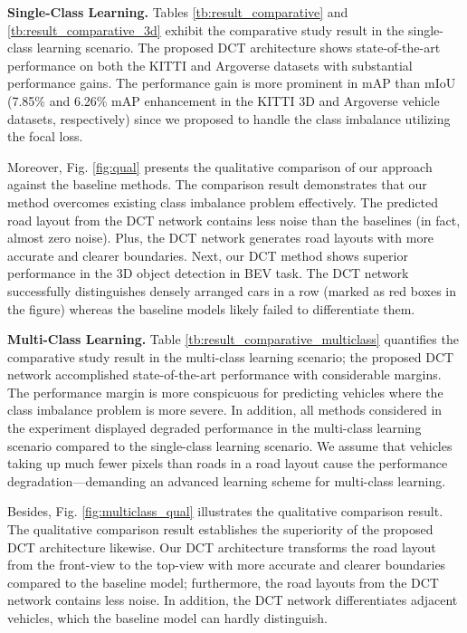 \textbf{Single-Class Learning.}
Tables \ref{tb:result_comparative} and \ref{tb:result_comparative_3d} exhibit the comparative study result in the single-class learning scenario. The proposed DCT architecture shows state-of-the-art performance on both the KITTI and Argoverse datasets with substantial performance gains. The performance gain is more prominent in mAP than mIoU (7.85\% and 6.26\% mAP enhancement in the KITTI 3D and Argoverse vehicle datasets, respectively) since we proposed to handle the class imbalance utilizing the focal loss.



Moreover, Fig. \ref{fig:qual} presents the qualitative comparison of our approach against the baseline methods. The comparison result demonstrates that our method overcomes existing class imbalance problem effectively. The predicted road layout from the DCT network contains less noise than the baselines (in fact, almost zero noise). Plus, the DCT network generates road layouts with more accurate and clearer boundaries. Next, our DCT method shows superior performance in the 3D object detection in BEV task. The DCT network successfully distinguishes densely arranged cars in a row (marked as red boxes in the figure) whereas the baseline models likely failed to differentiate them.


\textbf{Multi-Class Learning.}
Table \ref{tb:result_comparative_multiclass} quantifies the comparative study result in the multi-class learning scenario; the proposed DCT network accomplished state-of-the-art performance with considerable margins. The performance margin is more conspicuous for predicting vehicles where the class imbalance problem is more severe. In addition, all methods considered in the experiment displayed degraded performance in the multi-class learning scenario compared to the single-class learning scenario. We assume that vehicles taking up much fewer pixels than roads in a road layout cause the performance degradation---demanding an advanced learning scheme for multi-class learning.

Besides, Fig. \ref{fig:multiclass_qual} illustrates the qualitative comparison result. The qualitative comparison result establishes the superiority of the proposed DCT architecture likewise. Our DCT architecture transforms the road layout from the front-view to the top-view with more accurate and clearer boundaries compared to the baseline model; furthermore, the road layouts from the DCT network contains less noise. In addition, the DCT network differentiates adjacent vehicles, which the baseline model can hardly distinguish.



